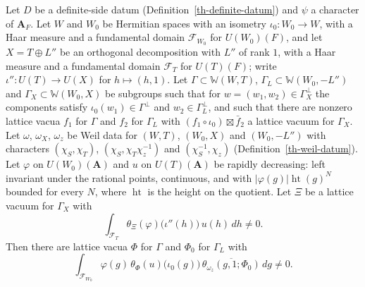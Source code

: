 \begin{theorem}\label{th-seesaw-period-nonvanishing}
Let $D$ be a definite-side datum (Definition~\ref{th-definite-datum}) and
$\psi$ a character of $\mathbf A_F$. Let $W$ and $W_0$ be Hermitian spaces
with an isometry $\iota_0\colon W_0\to W$, with a Haar measure and a
fundamental domain $\mathcal F_{W_0}$ for $U(W_0)(F)$, and let $X=T\oplus L''$
be an orthogonal decomposition with $L''$ of rank $1$, with a Haar measure and
a fundamental domain $\mathcal F_T$ for $U(T)(F)$; write
$\iota''\colon U(T)\to U(X)$ for $h\mapsto(h,1)$. Let
$\Gamma\subset\mathbb W(W,T)$, $\Gamma_L\subset\mathbb W(W_0,-L'')$ and
$\Gamma_X\subset\mathbb W(W_0,X)$ be subgroups such that for
$w=(w_1,w_2)\in\Gamma_X^\perp$ the components satisfy
$\iota_0(w_1)\in\Gamma^\perp$ and $w_2\in\Gamma_L^\perp$, and such that there
are nonzero lattice vacua $f_1$ for $\Gamma$ and $f_2$ for $\Gamma_L$ with
$(f_1\circ\iota_0)\boxtimes\bar f_2$ a lattice vacuum for $\Gamma_X$. Let
$\omega$, $\omega_X$, $\omega_z$ be Weil data for $(W,T)$, $(W_0,X)$ and
$(W_0,-L'')$ with characters $(\chi_S,\chi_T)$, $(\chi_S,\chi_T\chi_z^{-1})$
and $(\chi_S^{-1},\chi_z)$ (Definition~\ref{th-weil-datum}). Let $\varphi$ on
$U(W_0)(\mathbf A)$ and $u$ on $U(T)(\mathbf A)$ be rapidly decreasing: left
invariant under the rational points, continuous, and with
$|\varphi(g)|\operatorname{ht}(g)^N$ bounded for every $N$, where
$\operatorname{ht}$ is the height on the quotient. Let $\Xi$ be a lattice
vacuum for $\Gamma_X$ with
\[
\int_{\mathcal F_T}\theta_\Xi(\varphi)\bigl(\iota''(h)\bigr)\,u(h)\,dh\neq0 .
\]
Then there are lattice vacua $\Phi$ for $\Gamma$ and $\Phi_0$ for $\Gamma_L$
with
\[
\int_{\mathcal F_{W_0}}\varphi(g)\,\theta_\Phi(u)\bigl(\iota_0(g)\bigr)\,
\overline{\theta_{\omega_z}(g,1;\Phi_0)}\,dg\neq0 .
\]
\end{theorem}
